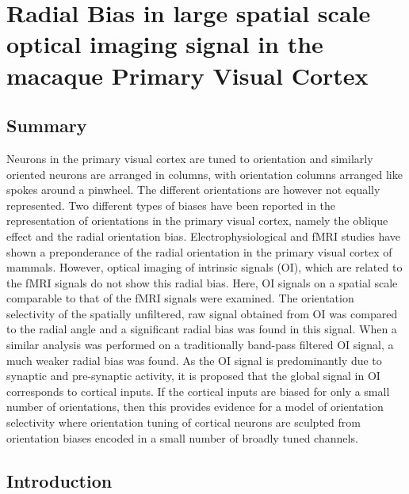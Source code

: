 
\chapter{Radial Bias in large spatial scale optical imaging signal in the macaque Primary Visual Cortex}

\pagebreak

	\section{Summary}
	
	Neurons in the primary visual cortex are tuned to orientation and similarly oriented neurons are arranged in columns, with orientation columns arranged like spokes around a pinwheel. The different orientations are however not equally represented. Two different types of biases have been reported in the representation of orientations in the primary visual cortex, namely the oblique effect and the radial orientation bias. Electrophysiological and fMRI studies have shown a preponderance of the radial orientation in the primary visual cortex of mammals. However, optical imaging of intrinsic signals (OI), which are related to the fMRI signals do not show this radial bias. Here, OI signals on a spatial scale comparable to that of the fMRI signals were examined. The orientation selectivity of the spatially unfiltered, raw signal obtained from OI was compared to the radial angle and a significant radial bias was found in this signal. When a similar analysis was performed on a traditionally band-pass filtered OI signal, a much weaker radial bias was found. As the OI signal is predominantly due to synaptic and pre-synaptic activity, it is proposed that the global signal in OI corresponds to cortical inputs. If the cortical inputs are biased for only a small number of orientations, then this provides evidence for a model of orientation selectivity where orientation tuning of cortical neurons are sculpted from orientation biases encoded in a small number of broadly tuned channels.
			
\pagebreak

	\section{Introduction}
	
